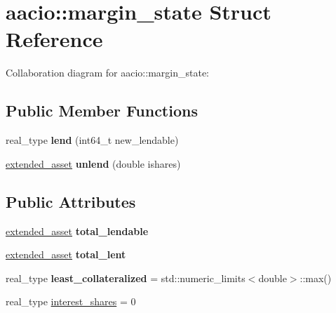\hypertarget{structaacio_1_1margin__state}{}\section{aacio\+:\+:margin\+\_\+state Struct Reference}
\label{structaacio_1_1margin__state}


Collaboration diagram for aacio\+:\+:margin\+\_\+state\+:
\subsection*{Public Member Functions}
\begin{DoxyCompactItemize}
\item 
\mbox{\label{structaacio_1_1margin__state_a915ffc3b950e377eb4ccfac4de870b9f}} 
real\+\_\+type {\bfseries lend} (int64\+\_\+t new\+\_\+lendable)
\item 
\mbox{\label{structaacio_1_1margin__state_a4d4d99487bc4c8d1941ee78c34cd1284}} 
\mbox{\hyperlink{structaacio_1_1extended__asset}{extended\+\_\+asset}} {\bfseries unlend} (double ishares)
\end{DoxyCompactItemize}
\subsection*{Public Attributes}
\begin{DoxyCompactItemize}
\item 
\mbox{\label{structaacio_1_1margin__state_a381ddfb8f12719dc5a5c0499529d1624}} 
\mbox{\hyperlink{structaacio_1_1extended__asset}{extended\+\_\+asset}} {\bfseries total\+\_\+lendable}
\item 
\mbox{\label{structaacio_1_1margin__state_ab6eb83b8753c65272fc10a7a2e475ea3}} 
\mbox{\hyperlink{structaacio_1_1extended__asset}{extended\+\_\+asset}} {\bfseries total\+\_\+lent}
\item 
\mbox{\label{structaacio_1_1margin__state_aaa9bba196c9dcd5a84e973275465dce7}} 
real\+\_\+type {\bfseries least\+\_\+collateralized} = std\+::numeric\+\_\+limits$<$double$>$\+::max()
\item 
real\+\_\+type \mbox{\hyperlink{structaacio_1_1margin__state_ac4e28861b6e34e7845742965ba824771}{interest\+\_\+shares}} = 0
\end{DoxyCompactItemize}


